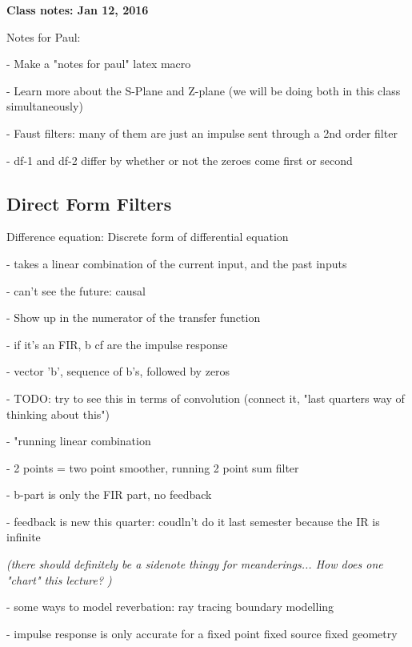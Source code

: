 \textbf{Class notes: Jan 12, 2016}

Notes for Paul:

- Make a "notes for paul" latex macro

- Learn more about the S-Plane and Z-plane (we will be doing both in this class 
simultaneously)

- Faust filters: many of them are just an impulse sent through a 2nd order filter

- df-1 and df-2 differ by whether or not the zeroes come first or second


\subsection*{Direct Form Filters}



Difference equation: Discrete form of differential equation

- takes a linear combination of the current input, and the past inputs

- can't see the future: causal

- Show up in the numerator of the transfer function

- if it's an FIR, b cf are the impulse response

- vector 'b', sequence of b's, followed by zeros

- TODO: try to see this in terms of convolution (connect it, "last quarters way of thinking about this")

- "running linear combination

- 2 points = two point smoother, running 2 point sum filter

- b-part is only the FIR part, no feedback

- feedback is new this quarter: coudln't do it last semester because the IR is infinite

\textit{(there should definitely be a sidenote thingy for meanderings...
How does one "chart" this lecture?
)} 

- some ways to  model reverbation: ray tracing boundary modelling


- impulse response is only accurate for a fixed point fixed source fixed geometry

